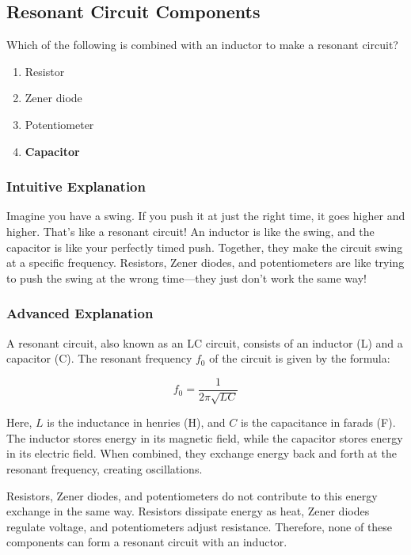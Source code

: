 \subsection{Resonant Circuit Components}
\label{T6D08}

\begin{tcolorbox}[colback=gray!10!white,colframe=black!75!black,title=T6D08]
Which of the following is combined with an inductor to make a resonant circuit?
\begin{enumerate}[label=\Alph*)]
    \item Resistor
    \item Zener diode
    \item Potentiometer
    \item \textbf{Capacitor}
\end{enumerate}
\end{tcolorbox}

\subsubsection{Intuitive Explanation}
Imagine you have a swing. If you push it at just the right time, it goes higher and higher. That's like a resonant circuit! An inductor is like the swing, and the capacitor is like your perfectly timed push. Together, they make the circuit swing at a specific frequency. Resistors, Zener diodes, and potentiometers are like trying to push the swing at the wrong time—they just don't work the same way!

\subsubsection{Advanced Explanation}
A resonant circuit, also known as an LC circuit, consists of an inductor (L) and a capacitor (C). The resonant frequency \( f_0 \) of the circuit is given by the formula:

\[
f_0 = \frac{1}{2\pi\sqrt{LC}}
\]

Here, \( L \) is the inductance in henries (H), and \( C \) is the capacitance in farads (F). The inductor stores energy in its magnetic field, while the capacitor stores energy in its electric field. When combined, they exchange energy back and forth at the resonant frequency, creating oscillations.

Resistors, Zener diodes, and potentiometers do not contribute to this energy exchange in the same way. Resistors dissipate energy as heat, Zener diodes regulate voltage, and potentiometers adjust resistance. Therefore, none of these components can form a resonant circuit with an inductor.


